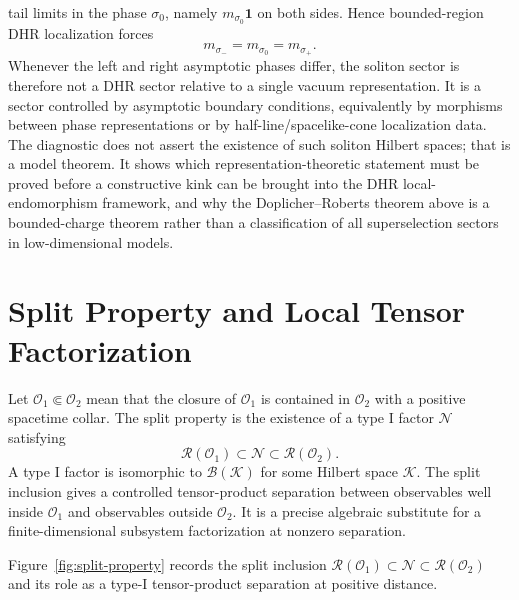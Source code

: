 tail limits in the phase \(\sigma_0\), namely \(m_{\sigma_0}\mathbf 1\) on
both sides.  Hence bounded-region DHR localization forces
\[
  m_{\sigma_-}=m_{\sigma_0}=m_{\sigma_+}.
\]
Whenever the left and right asymptotic phases differ, the soliton sector is
therefore not a DHR sector relative to a single vacuum representation.  It is
a sector controlled by asymptotic boundary conditions, equivalently by
morphisms between phase representations or by half-line/spacelike-cone
localization data.  The diagnostic does not assert the existence of such
soliton Hilbert spaces; that is a model theorem.  It shows which
representation-theoretic statement must be proved before a constructive kink
can be brought into the DHR local-endomorphism framework, and why the
Doplicher--Roberts theorem above is a bounded-charge theorem rather than a
classification of all superselection sectors in low-dimensional models.

\section{Split Property and Local Tensor Factorization}

Let \(\mathcal O_1\Subset \mathcal O_2\) mean that the closure of
\(\mathcal O_1\) is contained in \(\mathcal O_2\) with a positive spacetime
collar.  The split property is the existence
of a type I factor \(\mathcal N\) satisfying
\begin{equation}
  \mathcal R(\mathcal O_1)\subset \mathcal N\subset \mathcal R(\mathcal O_2).
  \label{eq:split-inclusion}
\end{equation}
A type I factor is isomorphic to \(\mathcal B(\mathcal K)\) for some Hilbert space
\(\mathcal K\).  The split inclusion gives a controlled tensor-product
separation between observables well inside \(\mathcal O_1\) and observables
outside \(\mathcal O_2\).  It is a precise algebraic substitute for a
finite-dimensional
subsystem factorization at nonzero separation.

Figure~\ref{fig:split-property} records the split inclusion
\(\mathcal R(\mathcal O_1)\subset\mathcal N\subset\mathcal R(\mathcal O_2)\)
and its role as a type-I tensor-product separation at positive distance.

